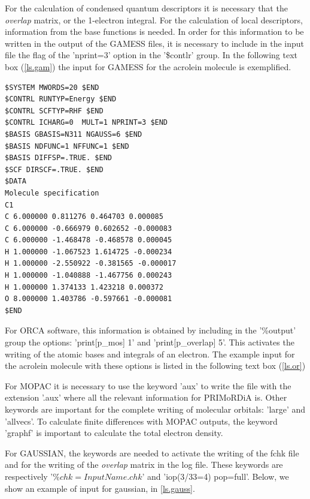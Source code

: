 \documentclass[a4paper,11pt]{refart}
\begin{document}
For the calculation of condensed quantum descriptors it is necessary that the \textit{overlap} matrix, or the 1-electron integral. For the calculation of local descriptors, information from the base functions is needed. In order for this information to be written in the output of the GAMESS files, it is necessary to include in the input file the flag of the 'nprint=3' option in the '\$contlr' group. In the following text box (\autoref{ls.gam}) the input for GAMESS for the acrolein molecule is exemplified.

\begin{minipage}{\textwidth}
\begin{lstlisting}[caption={Input Example for Gamess},label={ls.gam}]
$SYSTEM MWORDS=20 $END
$CONTRL RUNTYP=Energy $END
$CONTRL SCFTYP=RHF $END
$CONTRL ICHARG=0  MULT=1 NPRINT=3 $END
$BASIS GBASIS=N311 NGAUSS=6 $END
$BASIS NDFUNC=1 NFFUNC=1 $END
$BASIS DIFFSP=.TRUE. $END
$SCF DIRSCF=.TRUE. $END
$DATA
Molecule specification
C1
C 6.000000 0.811276 0.464703 0.000085
C 6.000000 -0.666979 0.602652 -0.000083
C 6.000000 -1.468478 -0.468578 0.000045
H 1.000000 -1.067523 1.614725 -0.000234
H 1.000000 -2.550922 -0.381565 -0.000017
H 1.000000 -1.040888 -1.467756 0.000243
H 1.000000 1.374133 1.423218 0.000372
O 8.000000 1.403786 -0.597661 -0.000081
$END
\end{lstlisting}
\end{minipage}

For ORCA software, this information is obtained by including in the '\%output' group the options: 'print[p\_mos] 1' and 'print[p\_overlap] 5'. This activates the writing of the atomic bases and integrals of an electron. The example input for the acrolein molecule with these options is listed in the following text box (\autoref{ls.or})

For MOPAC it is necessary to use the keyword 'aux' to write the file with the extension '.aux' where all the relevant information for PRIMoRDiA is. Other keywords are important for the complete writing of molecular orbitals: 'large' and 'allvecs'. To calculate finite differences with MOPAC outputs, the keyword 'graphf' is important to calculate the total electron density.

For GAUSSIAN, the keywords are needed to activate the writing of the fchk file and for the writing of the \textit{overlap} matrix in the log file. These keywords are respectively '$\%chk=InputName.chk$' and 'iop(3/33=4) pop=full'. Below, we show an example of input for gaussian, in \autoref{ls.gauss}.
\end{document}
